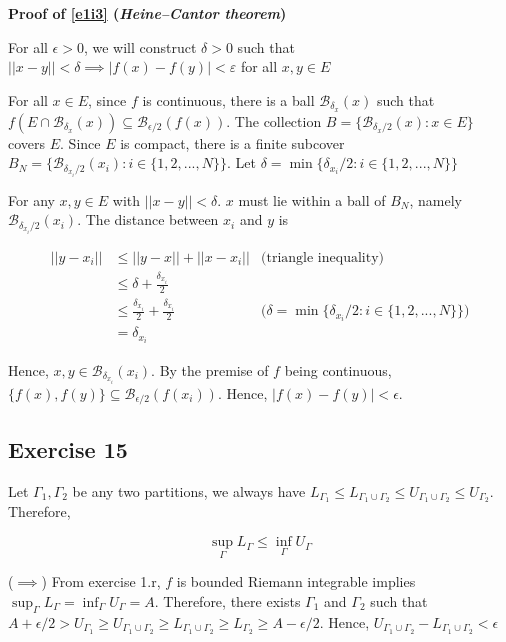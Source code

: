 \documentclass{article}
\newcommand\Ball{\mathcal{B}}
\begin{document}
\textbf{Proof of \ref{e1i3} (\emph{Heine–Cantor theorem})}

For all $\epsilon > 0$, we will construct $\delta > 0$ such that $||x - y|| < \delta \implies |f(x) - f(y)| < ε$
for all $x, y \in E$

For all $x \in E$, since $f$ is continuous, there is a ball $\Ball_{\delta_x}(x)$ such that $f(E \cap \Ball_{\delta_x}(x)) \subseteq \Ball_{\epsilon / 2}(f(x))$. The collection $B = \{ \Ball_{\delta_x / 2}(x): x \in E \}$ covers $E$. Since $E$ is compact, there is a finite subcover $B_N = \{ \Ball_{\delta_{x_i} / 2}(x_i): i \in \{1, 2, ..., N \} \}$. Let $\delta = \min \{\delta_{x_i} / 2: i \in \{1, 2, ..., N \} \}$

For any $x, y \in E$ with $||x - y|| < \delta$. $x$ must lie within a ball of $B_N$, namely $\Ball_{\delta_{x_i} / 2}(x_i)$. The distance between $x_i$ and $y$ is

\begin{align*}
    ||y - x_i|| &\leq ||y - x|| + ||x - x_i|| &\text{(triangle inequality)}\\
                &\leq  \delta + \frac{\delta_{x_i}}{2} \\
                &\leq  \frac{\delta_{x_i}}{2} + \frac{\delta_{x_i}}{2} &\text{($\delta = \min \{\delta_{x_i} / 2: i \in \{1, 2, ..., N \} \}$)}\\
                &= \delta_{x_i} 
\end{align*}

Hence, $x, y \in \Ball_{\delta_{x_i}}(x_i)$. By the premise of $f$ being continuous, $\{ f(x), f(y) \} \subseteq \Ball_{\epsilon / 2}(f(x_i))$.
Hence, $|f(x) - f(y)| < \epsilon$.


\subsection{Exercise 15}%

Let $\Gamma_1, \Gamma_2$ be any two partitions, we always have $L_{\Gamma_1} \leq L_{\Gamma_1 \cup \Gamma_2} \leq U_{\Gamma_1 \cup \Gamma_2} \leq U_{\Gamma_2}$. Therefore,

\[
    \sup_\Gamma L_\Gamma \leq \inf_\Gamma U_\Gamma
\]

($\implies$)
From exercise 1.r, $f$ is bounded Riemann integrable implies $\sup_\Gamma L_\Gamma = \inf_\Gamma U_\Gamma = A$. Therefore, there exists $\Gamma_1$ and $\Gamma_2$ such that $A + \epsilon/2 > U_{\Gamma_1} \geq U_{\Gamma_1 \cup \Gamma_2} \geq L_{\Gamma_1 \cup \Gamma_2} \geq L_{\Gamma_2} \geq A - \epsilon/2$. Hence, $U_{\Gamma_1 \cup \Gamma_2} - L_{\Gamma_1 \cup \Gamma_2} < \epsilon$
\end{document}
